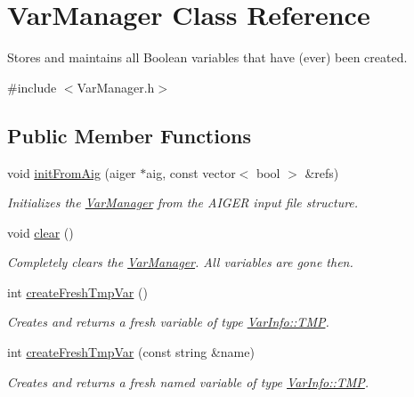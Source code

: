 \hypertarget{classVarManager}{\section{Var\-Manager Class Reference}
\label{classVarManager}
}


Stores and maintains all Boolean variables that have (ever) been created.  




{\ttfamily \#include $<$Var\-Manager.\-h$>$}

\subsection*{Public Member Functions}
\begin{DoxyCompactItemize}
\item 
void \hyperlink{classVarManager_a45201ce6cef8d48c0ae9d69b1d3870aa}{init\-From\-Aig} (aiger $\ast$aig, const vector$<$ bool $>$ \&refs)
\begin{DoxyCompactList}\small\item\em Initializes the \hyperlink{classVarManager}{Var\-Manager} from the A\-I\-G\-E\-R input file structure. \end{DoxyCompactList}\item 
void \hyperlink{classVarManager_abfb2f96f2037ef8d6aa89b1e25f71a13}{clear} ()
\begin{DoxyCompactList}\small\item\em Completely clears the \hyperlink{classVarManager}{Var\-Manager}. All variables are gone then. \end{DoxyCompactList}\item 
int \hyperlink{classVarManager_aa718b7329981e7e5cd845190ef487b7d}{create\-Fresh\-Tmp\-Var} ()
\begin{DoxyCompactList}\small\item\em Creates and returns a fresh variable of type \hyperlink{classVarInfo_a64d1da76cf84fe674e5fef9764ef11cfa84a2d8d86f004930fe564dc5b395b29f}{Var\-Info\-::\-T\-M\-P}. \end{DoxyCompactList}\item 
int \hyperlink{classVarManager_a0474d06bb55484941de3407d0d35a1ec}{create\-Fresh\-Tmp\-Var} (const string \&name)
\begin{DoxyCompactList}\small\item\em Creates and returns a fresh named variable of type \hyperlink{classVarInfo_a64d1da76cf84fe674e5fef9764ef11cfa84a2d8d86f004930fe564dc5b395b29f}{Var\-Info\-::\-T\-M\-P}. \end{DoxyCompactList}\item 

\end{DoxyCompactItemize}
